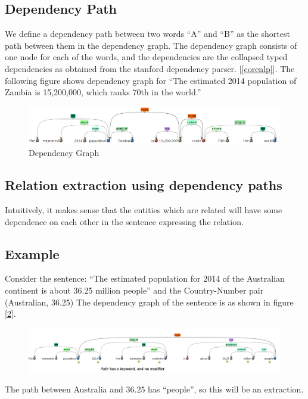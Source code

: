 \documentclass[a4paper,10pt]{article}
\begin{document}
\subsection{Dependency Path}
We define a dependency path between two words ``A'' and ``B'' as the shortest path between them in the dependency graph.
The dependency graph consists of one node for each of the words, and the dependencies are the collapsed typed dependencies 
as obtained from the stanford dependency parser. [\ref{corenlp}]. 
The following figure shows dependency graph for ``The estimated 2014 population of Zambia is 15,200,000, which ranks 70th in the world.''
\begin{figure}
 \centering
 \includegraphics[bb=0 0 990 149, scale = 0.4]{./dep.png}
 \caption{Dependency Graph}
 \label{fig:1}
\end{figure}


\subsection{Relation extraction using dependency paths}
Intuitively, it makes sense that the entities which are related will have some dependence on each other in the sentence 
expressing the relation.


\subsection{Example}
Consider the sentence:
``The estimated population for 2014 of the Australian continent	is about 36.25 million people''
and the Country-Number pair (Australian, 36.25)
The dependency graph of the sentence is as shown in figure [\ref{pos}].
\begin{figure}[h]
 \centering
 \includegraphics[bb=0 0 1292 228,scale=0.3]{./dep_pos.png}
 \label{pos}
\end{figure}
The path between Australia and 36.25 has ``people'', so this will be an extraction.
\end{document}
